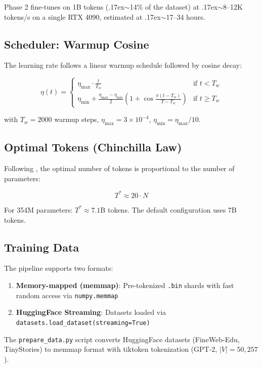 Phase 2 fine-tunes on 1B tokens ({\raise.17ex\hbox{$\scriptstyle\sim$}}14\% of the dataset)
at {\raise.17ex\hbox{$\scriptstyle\sim$}}8--12K tokens/s on a single RTX 4090,
estimated at {\raise.17ex\hbox{$\scriptstyle\sim$}}17--34 hours.

\subsection{Scheduler: Warmup Cosine}

The learning rate follows a linear warmup schedule followed by cosine
decay:

\begin{equation}
    \eta(t) = \begin{cases}
        \eta_{\max} \cdot \frac{t}{T_w} & \text{if } t < T_w \\
        \eta_{\min} + \frac{\eta_{\max} - \eta_{\min}}{2} \left(1 + \cos\frac{\pi(t - T_w)}{T - T_w}\right) & \text{if } t \geq T_w
    \end{cases}
\end{equation}

with $T_w = 2000$ warmup steps, $\eta_{\max} = 3 \times 10^{-4}$,
$\eta_{\min} = \eta_{\max} / 10$.

\subsection{Optimal Tokens (Chinchilla Law)}

Following \cite{hoffmann2022chinchilla}, the optimal number of tokens
is proportional to the number of parameters:

\begin{equation}
    T^* \approx 20 \cdot N
\end{equation}

For 354M parameters: $T^* \approx 7.1$B tokens. The default
configuration uses 7B tokens.

\subsection{Training Data}

The pipeline supports two formats:

\begin{enumerate}
    \item \textbf{Memory-mapped (memmap)}: Pre-tokenized \texttt{.bin}
    shards with fast random access via \texttt{numpy.memmap}
    \item \textbf{HuggingFace Streaming}: Datasets loaded via
    \texttt{datasets.load\_dataset(streaming=True)}
\end{enumerate}

The \texttt{prepare\_data.py} script converts HuggingFace datasets
(FineWeb-Edu, TinyStories) to memmap format with tiktoken tokenization
(GPT-2, $|V| = 50{,}257$).

